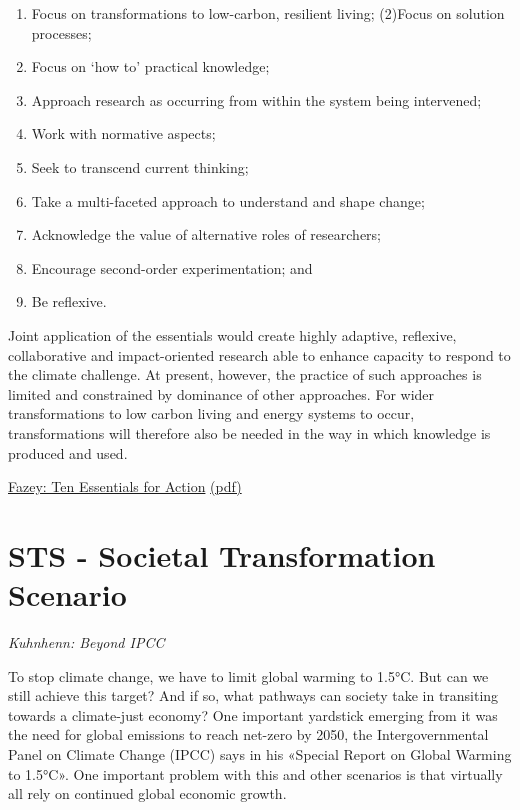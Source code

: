 \documentclass[
]{book}
\providecommand{\tightlist}{%
  \setlength{\itemsep}{0pt}\setlength{\parskip}{0pt}}
\begin{document}
\begin{enumerate}
\def\labelenumi{(\arabic{enumi})}
\tightlist
\item
  Focus on transformations to low-carbon, resilient living;
  (2)Focus on solution processes;
\item
  Focus on `how to' practical knowledge;
\item
  Approach research as occurring from within the system being intervened;
\item
  Work with normative aspects;
\item
  Seek to transcend current thinking;
\item
  Take a multi-faceted approach to understand and shape change;
\item
  Acknowledge the value of alternative roles of researchers;
\item
  Encourage second-order experimentation; and
\item
  Be reflexive.
\end{enumerate}

Joint application of the
essentials would create highly adaptive, reflexive, collaborative and impact-oriented research able to enhance
capacity to respond to the climate challenge. At present, however, the practice of such approaches is limited and
constrained by dominance of other approaches. For wider transformations to low carbon living and energy
systems to occur, transformations will therefore also be needed in the way in which knowledge is produced and
used.

\href{https://reader.elsevier.com/reader/sd/pii/S2214629617304413?token=817149646451360A90945310B67ABAC7C6C3EF55A11B2E9C4FF912AD621159A7360FF543919CFBD1F4C7B89342B7D78F}{Fazey: Ten Essentials for Action}
\href{pdf/Fazey_2018_Ten_Essentials_for_Action.pdf}{(pdf)}

\hypertarget{sts---societal-transformation-scenario}{%
\section{STS - Societal Transformation Scenario}\label{sts---societal-transformation-scenario}}

\emph{Kuhnhenn: Beyond IPCC}

To stop climate change, we have to limit global warming to 1.5°C. But can we still achieve this target? And if so, what pathways can society take in transiting towards a climate-just economy? One important yardstick emerging from it was the need for global emissions to reach net-zero by 2050, the Intergovernmental Panel on Climate Change (IPCC) says in his «Special Report on Global Warming to 1.5°C». One important problem with this and other scenarios is that virtually all rely on continued global economic growth.
\end{document}

